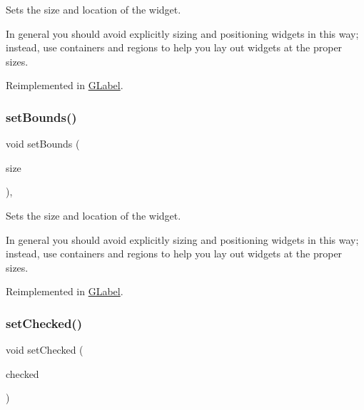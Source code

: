 Sets the size and location of the widget. 

In general you should avoid explicitly sizing and positioning widgets in this way; instead, use containers and regions to help you lay out widgets at the proper sizes. 

Reimplemented in \mbox{\hyperlink{classsgl_1_1GLabel_ab9f89f193ad29d66c547cfee29ffde39}{G\+Label}}.

\mbox{\label{classsgl_1_1GInteractor_acada386653f008cacc7cce86426bef7c}} 
\subsubsection{\texorpdfstring{set\+Bounds()}{setBounds()}\hspace{0.1cm}{\footnotesize\ttfamily [2/2]}}
{\footnotesize\ttfamily void set\+Bounds (\begin{DoxyParamCaption}\item[{const \mbox{\hyperlink{structsgl_1_1GRectangle}{G\+Rectangle}} \&}]{size }\end{DoxyParamCaption})\hspace{0.3cm}{\ttfamily [virtual]}, {\ttfamily [inherited]}}



Sets the size and location of the widget. 

In general you should avoid explicitly sizing and positioning widgets in this way; instead, use containers and regions to help you lay out widgets at the proper sizes. 

Reimplemented in \mbox{\hyperlink{classsgl_1_1GLabel_adb836652705fdc4b7e90b7a3afc56a37}{G\+Label}}.

\mbox{\label{classsgl_1_1GRadioButton_a116285e2f56247b00b26035ca0ac4737}} 
\subsubsection{\texorpdfstring{set\+Checked()}{setChecked()}}
{\footnotesize\ttfamily void set\+Checked (\begin{DoxyParamCaption}\item[{bool}]{checked }\end{DoxyParamCaption})\hspace{0.3cm}{\ttfamily [virtual]}}



